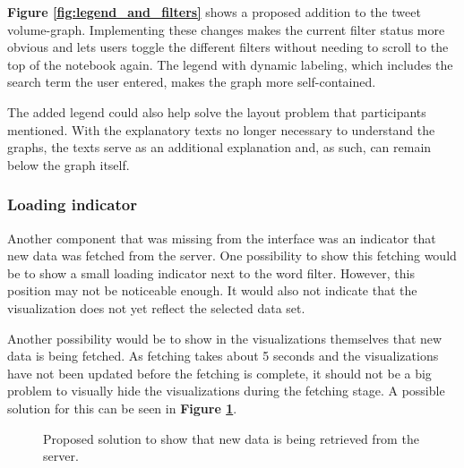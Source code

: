 \textbf{Figure \ref{fig:legend_and_filters}} shows a proposed addition to the tweet volume-graph. Implementing these changes makes the current filter status more obvious and lets users toggle the different filters without needing to scroll to the top of the notebook again. The legend with dynamic labeling, which includes the search term the user entered, makes the graph more self-contained.

The added legend could also help solve the layout problem that participants mentioned. With the explanatory texts no longer necessary to understand the graphs, the texts serve as an additional explanation and, as such, can remain below the graph itself.

\subsubsection*{Loading indicator}
Another component that was missing from the interface was an indicator that new data was fetched from the server. One possibility to show this fetching would be to show a small loading indicator next to the word filter. However, this position may not be noticeable enough. It would also not indicate that the visualization does not yet reflect the selected data set.

Another possibility would be to show in the visualizations themselves that new data is being fetched. As fetching takes about 5 seconds and the visualizations have not been updated before the fetching is complete, it should not be a big problem to visually hide the visualizations during the fetching stage. A possible solution for this can be seen in \textbf{Figure \ref{fig:fetching_state}}.

\begin{figure}[htb]
    \caption{Proposed solution to show that new data is being retrieved from the server.}
    \label{fig:fetching_state}
\end{figure}

